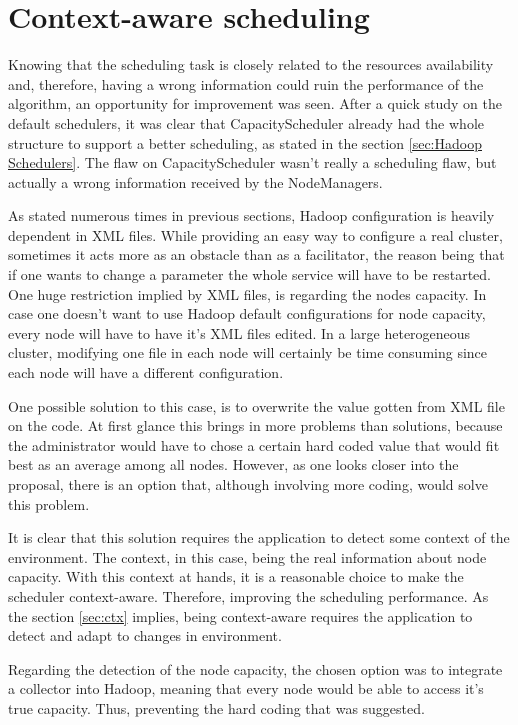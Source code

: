 \section{Context-aware scheduling}
Knowing that the scheduling task is closely related to the resources availability and, therefore, having a wrong information could ruin the performance of the algorithm, an opportunity for improvement was seen. After a quick study on the default schedulers, it was clear that CapacityScheduler already had the whole structure to support a better scheduling, as stated in the section \ref{sec:Hadoop Schedulers}. The flaw on CapacityScheduler wasn't really a scheduling flaw, but actually a wrong information received by the NodeManagers.

As stated numerous times in previous sections, Hadoop configuration is heavily dependent in XML files. While providing an easy way to configure a real cluster, sometimes it acts more as an obstacle than as a facilitator, the reason being that if one wants to change a parameter the whole service will have to be restarted. One huge restriction implied by XML files, is regarding the nodes capacity. In case one doesn't want to use Hadoop default configurations for node capacity, every node will have to have it's XML files edited. In a large heterogeneous cluster, modifying one file in each node will certainly be time consuming since each node will have a different configuration. 

One possible solution to this case, is to overwrite the value gotten from XML file on the code. At first glance this brings in more problems than solutions, because the administrator would have to chose a certain hard coded value that would fit best as an average among all nodes. However, as one looks closer into the proposal, there is an option that, although involving more coding, would solve this problem. 

It is clear that this solution requires the application to detect some context of the environment. The context, in this case, being the real information about node capacity. With this context at hands, it is a reasonable choice to make the scheduler context-aware. Therefore, improving the scheduling performance. As the section \ref{sec:ctx} implies, being context-aware requires the application to detect and adapt to changes in environment.

Regarding the detection of the node capacity, the chosen option was to integrate a collector into Hadoop, meaning that every node would be able to access it's true capacity. Thus, preventing the hard coding that was suggested.

